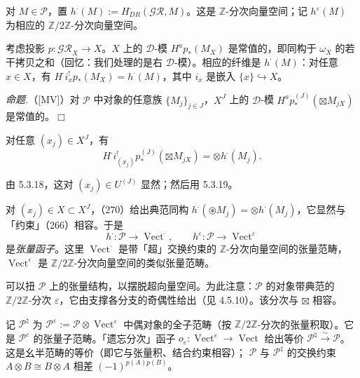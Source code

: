 
 对 $M\in\mathcal{P}$，置 $h^{\cdot}(M):=H^{\cdot}_{DR}(\mathcal{GR},M)$。这是 $\mathbb{Z}$-分次向量空间；记 $h^{\varepsilon}(M)$ 为相应的 $\mathbb{Z}/2\mathbb{Z}$-分次向量空间。

考虑投影 $p:\mathcal{GR}_X\to X$。$X$ 上的 $\mathcal{D}$-模 $H^ap_*(M_X)$ 是常值的，即同构于 $\omega_X$ 的若干拷贝之和（回忆：我们处理的是右 $\mathcal{D}$-模）。相应的纤维是 $h^{\cdot}(M)$：对任意 $x\in X$，有 $H^{\cdot}i_x^{!}p_*(M_X)=h^{\cdot}(M)$，其中 $i_x$ 是嵌入 $\{x\}\hookrightarrow X$。

 \emph{命题.}（[MV]）对 $\mathcal{P}$ 中对象的任意族 $\{M_j\}_{j\in J}$，$X^J$ 上的 $\mathcal{D}$-模 $H^ap_*^{(J)}(\boxtimes M_{jX})$ 是常值的。\hfill$\Box$

对任意 $(x_j)\in X^J$，有
\begin{equation}\tag{270}
H^{\cdot}i^{!}_{(x_j)}p_*^{(J)}(\boxtimes M_{jX})=\otimes h^{\cdot}(M_j).
\end{equation}

由 5.3.18，这对 $(x_j)\in U^{(J)}$ 显然；然后用 5.3.19。

 对 $(x_j)\in X\subset X^J$，（270）给出典范同构 $h^{\cdot}(\circledast M_j)=\otimes h^{\cdot}(M_j)$，它显然与「约束」（266）相容。于是
\begin{equation}\tag{271}
h^{\cdot}:\mathcal{P}\to\operatorname{Vect}^{\cdot},\qquad h^{\varepsilon}:\mathcal{P}\to\operatorname{Vect}^{\varepsilon}
\end{equation}
是\emph{张量函子}。这里 $\operatorname{Vect}^{\cdot}$ 是带「超」交换约束的 $\mathbb{Z}$-分次向量空间的张量范畴，$\operatorname{Vect}^{\varepsilon}$ 是 $\mathbb{Z}/2\mathbb{Z}$-分次向量空间的类似张量范畴。

 可以扭 $\mathcal{P}$ 上的张量结构，以摆脱超向量空间。为此注意：$\mathcal{P}$ 的对象带典范的 $\mathbb{Z}/2\mathbb{Z}$-分次 $\varepsilon$，它由支撑各分支的奇偶性给出（见 4.5.10）。该分次与 $\boxtimes$ 相容。

记 $\mathcal{P}^{\natural}$ 为 $\mathcal{P}^{\varepsilon}:=\mathcal{P}\otimes\operatorname{Vect}^{\varepsilon}$ 中偶对象的全子范畴（按 $\mathbb{Z}/2\mathbb{Z}$-分次的张量积取）。它是 $\mathcal{P}^{\varepsilon}$ 的张量子范畴。「遗忘分次」函子 $o_{\varepsilon}:\operatorname{Vect}^{\varepsilon}\to\operatorname{Vect}$ 给出等价 $\mathcal{P}^{\natural}\xrightarrow{\sim}\mathcal{P}$。这是幺半范畴的等价（即它与张量积、结合约束相容）；
$\mathcal{P}$ 与 $\mathcal{P}^{\natural}$ 的交换约束 $A\otimes B\cong B\otimes A$ 相差 $(-1)^{p(A)p(B)}$。

